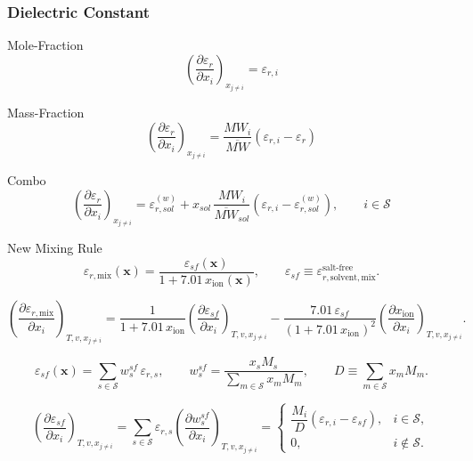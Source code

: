 \documentclass[12pt, letterpaper]{article}
\begin{document}
\subsubsection{Dielectric Constant}

Mole-Fraction
\begin{equation}
\left(\frac{\partial \varepsilon_r}{\partial x_i}\right)_{x_{j\neq i}}
= \varepsilon_{r, i}
\end{equation}

Mass-Fraction
\begin{equation}
\left(\frac{\partial \varepsilon_r}{\partial x_i}\right)_{x_{j\neq i}}
=
\frac{MW_i}{\overline{MW}}\left(\varepsilon_{r,i}-\varepsilon_r\right)
\end{equation}

Combo
\begin{equation}
\left(\frac{\partial \varepsilon_r}{\partial x_i}\right)_{x_{j\neq i}}
=
\varepsilon_{r,sol}^{(w)}
+
x_{sol}\,\frac{MW_i}{\overline{MW}_{sol}}
\left(\varepsilon_{r,i}-\varepsilon_{r,sol}^{(w)}\right),
\qquad i\in\mathcal S
\end{equation}

New Mixing Rule
\begin{equation}
\varepsilon_{r,\mathrm{mix}}(\mathbf{x})
=
\frac{\varepsilon_{sf}(\mathbf{x})}{1+7.01\,x_{\mathrm{ion}}(\mathbf{x})},
\qquad
\varepsilon_{sf}\equiv \varepsilon_{r,\mathrm{solvent,mix}}^{\mathrm{salt\text{-}free}} .
\end{equation}

\begin{equation}
\left(\frac{\partial \varepsilon_{r,\mathrm{mix}}}{\partial x_i}\right)_{T,v,x_{j\neq i}}
=
\frac{1}{1+7.01\,x_{\mathrm{ion}}}
\left(\frac{\partial \varepsilon_{sf}}{\partial x_i}\right)_{T,v,x_{j\neq i}}
-\frac{7.01\,\varepsilon_{sf}}{\left(1+7.01\,x_{\mathrm{ion}}\right)^2}
\left(\frac{\partial x_{\mathrm{ion}}}{\partial x_i}\right)_{T,v,x_{j\neq i}} .
\end{equation}

\begin{equation}
\varepsilon_{sf}(\mathbf{x})
=
\sum_{s\in\mathcal{S}} w_{s}^{sf}\,\varepsilon_{r,s},
\qquad
w_{s}^{sf}
=
\frac{x_s M_s}{\displaystyle \sum_{m\in\mathcal{S}} x_m M_m},
\qquad
D\equiv \sum_{m\in\mathcal{S}} x_m M_m .
\end{equation}

\begin{equation}
\left(\frac{\partial \varepsilon_{sf}}{\partial x_i}\right)_{T,v,x_{j\neq i}}
=
\sum_{s\in\mathcal{S}} \varepsilon_{r,s}
\left(\frac{\partial w_s^{sf}}{\partial x_i}\right)_{T,v,x_{j\neq i}}
=
\begin{cases}
\dfrac{M_i}{D}\left(\varepsilon_{r,i}-\varepsilon_{sf}\right), & i\in\mathcal{S},\\[10pt]
0, & i\notin\mathcal{S}.
\end{cases}
\end{equation}
\end{document}
